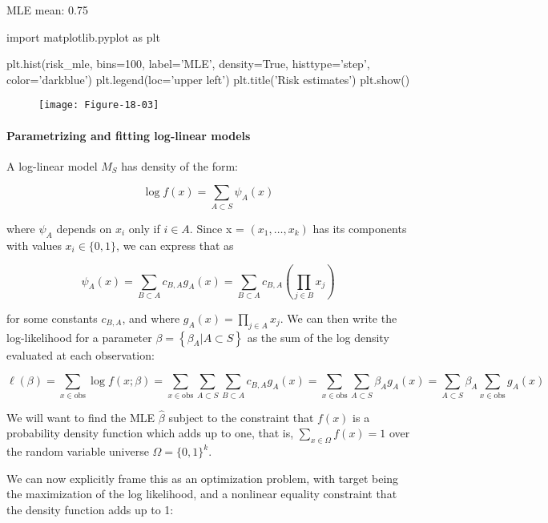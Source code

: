 \begin{console}
MLE mean: 0.75
\end{console}

\begin{python}
import matplotlib.pyplot as plt

plt.hist(risk_mle, bins=100, label='MLE', density=True, histtype='step', color='darkblue')
plt.legend(loc='upper left')
plt.title('Risk estimates')
plt.show()
\end{python}

\begin{figure}[H]
\texttt{[image: Figure-18-03]}
\end{figure}

\paragraph{Parametrizing and fitting log-linear models}\label{parametrizing-and-fitting-log-linear-models}

A log-linear model \(M_S\) has density of the form:

\[ \log f(x) = \sum_{A \subset S} \psi_A(x) \]

where \(\psi_A\) depends on \(x_i\) only if \(i \in A\). Since x =
\((x_1, \dots, x_k)\) has its components with values
\(x_i \in \{ 0, 1 \}\), we can express that as

\[ \psi_A(x) = \sum_{B \subset A} c_{B, A} g_A(x) = \sum_{B \subset A} c_{B, A} \left( \prod_{j \in B} x_j \right) \]

for some constants \(c_{B, A}\), and where
\(g_A(x) = \prod_{j \in A} x_j\). We can then write the log-likelihood
for a parameter \(\beta = \left\{ \beta_A | A \subset S \right\}\) as
the sum of the log density evaluated at each observation:

\[ \ell(\beta) = \sum_{x \in \text{obs}} \log f(x; \beta) =  \sum_{x \in \text{obs}} \sum_{A \subset S} \sum_{B \subset A} c_{B, A} g_A(x) = \sum_{x \in \text{obs}} \sum_{A \subset S} \beta_A g_A(x) = \sum_{A \subset S} \beta_A \sum_{x \in \text{obs}} g_A(x) \]

We will want to find the MLE \(\hat{\beta}\) subject to the constraint
that \(f(x)\) is a probability density function which adds up to one,
that is, \(\sum_{x \in \Omega} f(x) = 1\) over the random variable
universe \(\Omega = \{ 0, 1 \}^k\).

We can now explicitly frame this as an optimization problem, with target
being the maximization of the log likelihood, and a nonlinear equality
constraint that the density function adds up to 1:

